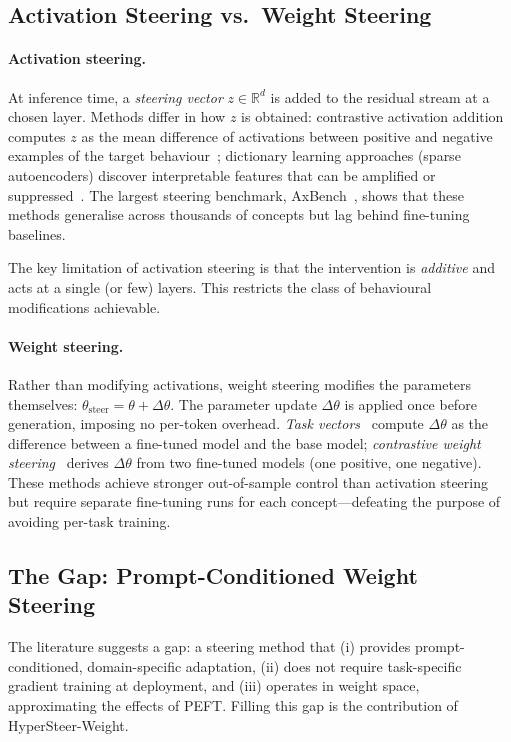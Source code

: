 \subsection{Activation Steering vs.\ Weight Steering}
\label{subsec:act-vs-weight}

\paragraph{Activation steering.} At inference time, a \emph{steering vector} $z\in\mathbb{R}^d$ is added to the residual stream at a chosen layer. Methods differ in how $z$ is obtained: contrastive activation addition computes $z$ as the mean difference of activations between positive and negative examples of the target behaviour~\cite{rimsky2024}; dictionary learning approaches (sparse autoencoders) discover interpretable features that can be amplified or suppressed~\cite{huben2024,joshi2025}. The largest steering benchmark, AxBench~\cite{wu2025}, shows that these methods generalise across thousands of concepts but lag behind fine-tuning baselines.

The key limitation of activation steering is that the intervention is \emph{additive} and acts at a single (or few) layers. This restricts the class of behavioural modifications achievable.

\paragraph{Weight steering.} Rather than modifying activations, weight steering modifies the parameters themselves: $\theta_{\mathrm{steer}} = \theta + \Delta\theta$. The parameter update $\Delta\theta$ is applied once before generation, imposing no per-token overhead. \emph{Task vectors}~\cite{ilharco2023} compute $\Delta\theta$ as the difference between a fine-tuned model and the base model; \emph{contrastive weight steering}~\cite{fierro2025} derives $\Delta\theta$ from two fine-tuned models (one positive, one negative). These methods achieve stronger out-of-sample control than activation steering but require separate fine-tuning runs for each concept---defeating the purpose of avoiding per-task training.

\subsection{The Gap: Prompt-Conditioned Weight Steering}
\label{subsec:gap}

The literature suggests a gap: a steering method that (i) provides prompt-conditioned, domain-specific adaptation, (ii) does not require task-specific gradient training at deployment, and (iii) operates in weight space, approximating the effects of PEFT. Filling this gap is the contribution of HyperSteer-Weight.

